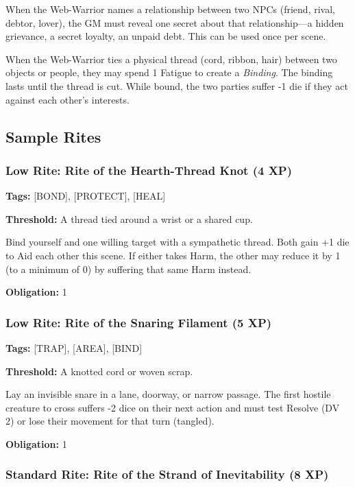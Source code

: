 When the Web-Warrior names a relationship between two NPCs (friend, rival, debtor, lover), the GM must reveal one secret about that relationship—a hidden grievance, a secret loyalty, an unpaid debt. This can be used once per scene.

When the Web-Warrior ties a physical thread (cord, ribbon, hair) between two objects or people, they may spend 1 Fatigue to create a \textit{Binding}. The binding lasts until the thread is cut. While bound, the two parties suffer -1 die if they act against each other's interests.

\subsection{Sample Rites}

\subsubsection{Low Rite: Rite of the Hearth-Thread Knot (4 XP)}

\textbf{Tags:} [BOND], [PROTECT], [HEAL]

\textbf{Threshold:} A thread tied around a wrist or a shared cup.

Bind yourself and one willing target with a sympathetic thread. Both gain +1 die to Aid each other this scene. If either takes Harm, the other may reduce it by 1 (to a minimum of 0) by suffering that same Harm instead.

\textbf{Obligation:} 1

\subsubsection{Low Rite: Rite of the Snaring Filament (5 XP)}

\textbf{Tags:} [TRAP], [AREA], [BIND]

\textbf{Threshold:} A knotted cord or woven scrap.

Lay an invisible snare in a lane, doorway, or narrow passage. The first hostile creature to cross suffers -2 dice on their next action and must test Resolve (DV 2) or lose their movement for that turn (tangled).

\textbf{Obligation:} 1

\subsubsection{Standard Rite: Rite of the Strand of Inevitability (8 XP)}


